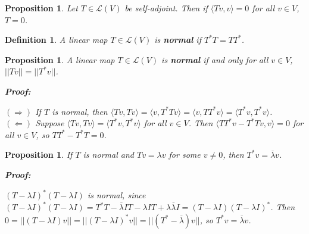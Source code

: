 \documentclass{article}
\theoremstyle{colontheorem}
\newtheorem{proposition}[theorem]{Proposition}
\newtheorem{definition}[theorem]{Definition}
\newenvironment{Proposition}
{
	\begin{mdframed}[backgroundcolor=TheoremOrange!10]
	\begin{proposition}
}
{
	\end{proposition}
	\end{mdframed}
	
	\vspace{.15in}
}
\newenvironment{Def}
{
	\begin{mdframed}[backgroundcolor=DefGreen!10]
	\begin{definition}
}
{
	\end{definition}
	\end{mdframed}
	
	\vspace{.15in}
}
\newenvironment{Proof}
{
	\begin{mdframed}[backgroundcolor=ProofPurple!10]
	\textbf{Proof:}%
}
{
	\end{mdframed}
	
	\vspace{.085in}
}
\begin{document}
\begin{Proposition}
	
	Let $T \in \mathcal{L}(V)$ be self-adjoint. Then if $\langle Tv, v \rangle = 0$ for all $v \in V$, $T = 0$.
	
\end{Proposition}



\begin{Def}
	
	A linear map $T \in \mathcal{L}(V)$ is \textbf{normal} if $T^* T = TT^*$.
	
\end{Def}



\begin{Proposition}
	
	A linear map $T \in \mathcal{L}(V)$ is \textbf{normal} if and only for all $v \in V$, $||Tv|| = ||T^* v||$.
	
	\begin{Proof}
		$(\Rightarrow)$ If $T$ is normal, then $\langle Tv, Tv \rangle = \langle v, T^* T v \rangle = \langle v, T T^* v \rangle = \langle T^* v, T^* v \rangle$.\\
		
		$(\Leftarrow)$ Suppose $\langle Tv, Tv \rangle = \langle T^* v, T^* v \rangle$ for all $v \in V$. Then $\langle TT^* v - T^* T v, v \rangle = 0$ for all $v \in V$, so $TT^* - T^* T = 0$.
		
	\end{Proof}
	
\end{Proposition}



\begin{Proposition}
	
	If $T$ is normal and $Tv = \lambda v$ for some $v \neq 0$, then $T^* v = \overline{\lambda} v$.
	
	\begin{Proof}
		$(T- \lambda I)^* (T - \lambda I)$ is normal, since $(T- \lambda I)^* (T - \lambda I) = T^* T - \overline{\lambda} IT - \lambda IT + \lambda \overline{\lambda} I = (T- \lambda I)(T - \lambda I)^*$. Then $0 = ||(T - \lambda I)v|| = ||(T - \lambda I)^* v|| = ||(T^* - \overline{\lambda})v||$, so $T^* v = \overline{\lambda} v$.
		
	\end{Proof}
	
\end{Proposition}
\end{document}
